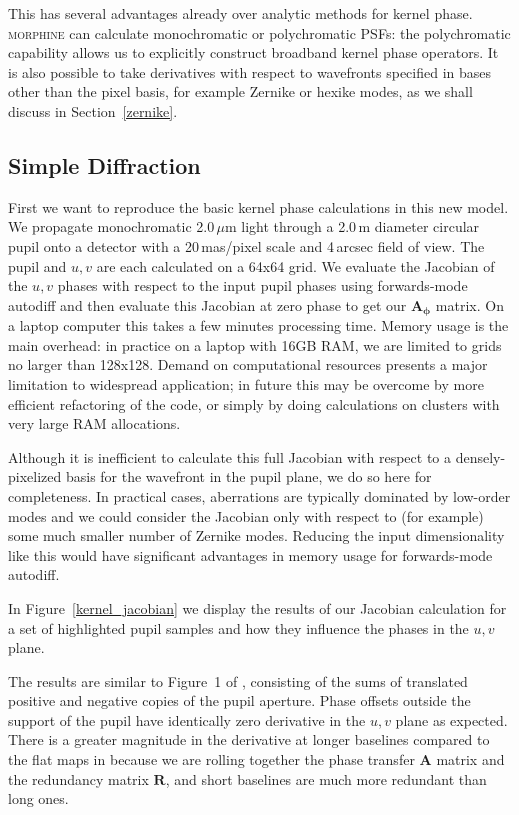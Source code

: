 \documentclass[modern]{aastex63}
\begin{document}
This has several advantages already over analytic methods for kernel phase. \textsc{morphine} can calculate monochromatic or polychromatic PSFs: the polychromatic capability allows us to explicitly construct broadband kernel phase operators. It is also possible to take derivatives with respect to wavefronts specified in bases other than the pixel basis, for example Zernike or hexike modes, as we shall discuss in Section~\ref{zernike}.

\subsection{Simple Diffraction}
\label{sec:simple}

First we want to reproduce the basic kernel phase calculations in this new model. We propagate monochromatic 2.0\,$\mu$m light through a 2.0\,m diameter circular pupil onto a detector with a 20\,mas/pixel scale and 4\,arcsec field of view. The pupil and $u,v$ are each calculated on a 64x64 grid. We evaluate the Jacobian of the $u,v$ phases with respect to the input pupil phases using forwards-mode autodiff and then evaluate this Jacobian at zero phase to get our $\mathbf{A_\phi}$ matrix. On a laptop computer this takes a few minutes processing time. Memory usage is the main overhead: in practice on a laptop with 16GB RAM, we are limited to grids no larger than 128x128. Demand on computational resources presents a major limitation to widespread application; in future this may be overcome by more efficient refactoring of the code, or simply by doing calculations on clusters with very large RAM allocations.

Although it is inefficient to calculate this full Jacobian with respect to a densely-pixelized basis for the wavefront in the pupil plane, we do so here for completeness. In practical cases, aberrations are typically dominated by low-order modes and we could consider the Jacobian only with respect to (for example) some much smaller number of Zernike modes. Reducing the input dimensionality like this would have significant advantages in memory usage for forwards-mode autodiff.

In Figure~\ref{kernel_jacobian} we display the results of our Jacobian calculation for a set of highlighted pupil samples and how they influence the phases in the $u,v$ plane. 

The results are similar to Figure~1 of \citet{martinache10}, consisting of the sums of translated positive and negative copies of the pupil aperture. Phase offsets outside the support of the pupil have identically zero derivative in the $u,v$ plane as expected. There is a greater magnitude in the derivative at longer baselines compared to the flat maps in \citet{martinache10} because we are rolling together the phase transfer $\mathbf{A}$ matrix and the redundancy matrix $\mathbf{R}$, and short baselines are much more redundant than long ones.
\end{document}
